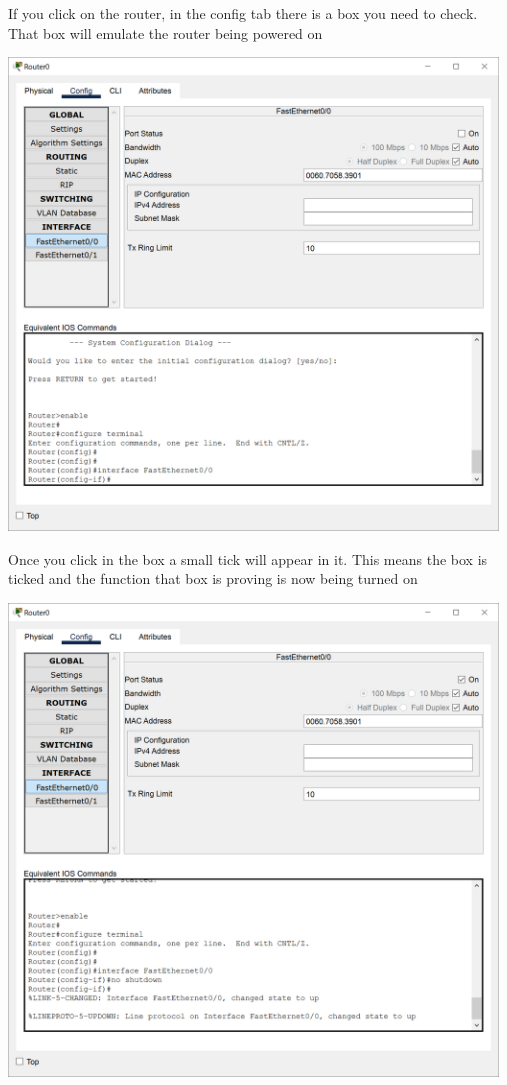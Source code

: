 \documentclass[a4paper,12pt]{book}
\begin{document}
\noindent If you click on the router, in the config tab there is a box you need to check. That box will emulate the router being powered on \newline

\noindent \includegraphics[width=13cm]{./step-by-step/13.PNG}
\clearpage


\noindent Once you click in the box a small tick will appear in it. This means the box is ticked and the function that box is proving is now being turned on \newline

\noindent \includegraphics[width=13cm]{./step-by-step/14.PNG}
\clearpage
\end{document}
